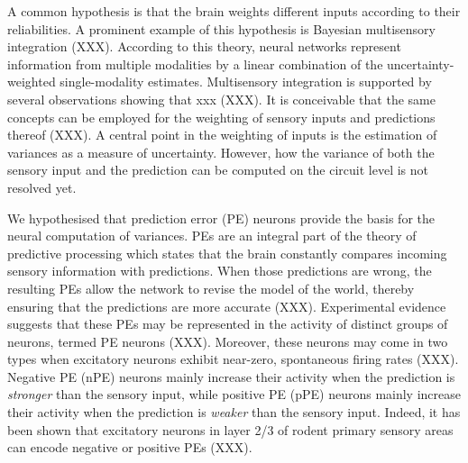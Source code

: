 \documentclass[10pt,a4paper]{article}
\begin{document}
A common hypothesis is that the brain weights different inputs according to their reliabilities. A prominent example of this hypothesis is Bayesian multisensory integration (XXX). According to this theory, neural networks represent information from multiple modalities by a linear combination of the uncertainty-weighted single-modality estimates. Multisensory integration is supported by several observations showing that xxx (XXX). It is conceivable that the same concepts can be employed for the weighting of sensory inputs and predictions thereof (XXX). A central point in the weighting of inputs is the estimation of variances as a measure of uncertainty. However, how the variance of both the sensory input and the prediction can be computed on the circuit level is not resolved yet.  

We hypothesised that prediction error (PE) neurons provide the basis for the neural computation of variances. PEs are an integral part of the theory of predictive processing which states that the brain constantly compares incoming sensory information with predictions. When those predictions are wrong, the resulting PEs allow the network to revise the model of the world, thereby ensuring that the predictions are more accurate (XXX). Experimental evidence suggests that these PEs may be represented in the activity of distinct groups of neurons, termed PE neurons (XXX). Moreover, these neurons may come in two types when excitatory neurons exhibit near-zero, spontaneous firing rates (XXX). Negative PE (nPE) neurons mainly increase their activity when the prediction is \textit{stronger} than the sensory input, while positive PE (pPE) neurons mainly increase their activity when the prediction is \textit{weaker} than the sensory input. Indeed, it has been shown that excitatory neurons in layer 2/3 of rodent primary sensory areas can encode negative or positive PEs (XXX). 
\end{document}
